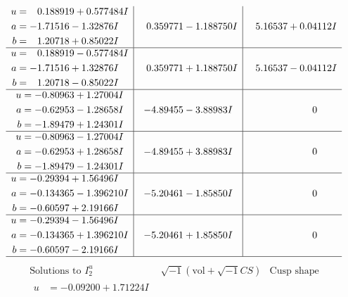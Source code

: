 \documentclass[1p]{elsarticle_modified}
\theoremstyle{definition}
\newcommand{\I}{\sqrt{-1}}
\begin{document}
$$\begin{array}{c|c|c}
\begin{aligned}
u &= \phantom{-}0.188919 + 0.577484 I \\
a &= -1.71516 - 1.32876 I \\
b &= \phantom{-}1.20718 + 0.85022 I\end{aligned}
 & \phantom{-}0.359771 - 1.188750 I & \phantom{-}5.16537 + 0.04112 I \\ \hline\begin{aligned}
u &= \phantom{-}0.188919 - 0.577484 I \\
a &= -1.71516 + 1.32876 I \\
b &= \phantom{-}1.20718 - 0.85022 I\end{aligned}
 & \phantom{-}0.359771 + 1.188750 I & \phantom{-}5.16537 - 0.04112 I \\ \hline\begin{aligned}
u &= -0.80963 + 1.27004 I \\
a &= -0.62953 - 1.28658 I \\
b &= -1.89479 + 1.24301 I\end{aligned}
 & -4.89455 - 3.88983 I & \phantom{-0.000000 } 0 \\ \hline\begin{aligned}
u &= -0.80963 - 1.27004 I \\
a &= -0.62953 + 1.28658 I \\
b &= -1.89479 - 1.24301 I\end{aligned}
 & -4.89455 + 3.88983 I & \phantom{-0.000000 } 0 \\ \hline\begin{aligned}
u &= -0.29394 + 1.56496 I \\
a &= -0.134365 - 1.396210 I \\
b &= -0.60597 + 2.19166 I\end{aligned}
 & -5.20461 - 1.85850 I & \phantom{-0.000000 } 0 \\ \hline\begin{aligned}
u &= -0.29394 - 1.56496 I \\
a &= -0.134365 + 1.396210 I \\
b &= -0.60597 - 2.19166 I\end{aligned}
 & -5.20461 + 1.85850 I & \phantom{-0.000000 } 0\\
 \hline 
 \end{array}$$\newpage$$\begin{array}{c|c|c}  
\text{Solutions to }I^u_{2}& \I (\text{vol} + \sqrt{-1}CS) & \text{Cusp shape}\\
 \hline 
\begin{aligned}
u &= -0.09200 + 1.71224 I \\

\end{aligned}
\end{array}$$
\end{document}
